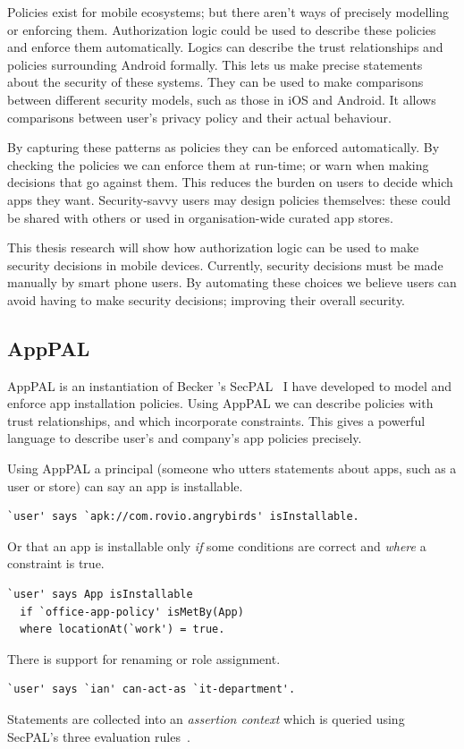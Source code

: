 \documentclass[a4paper]{scrartcl}
\begin{document}
Policies exist for mobile ecosystems; but there aren't ways of precisely modelling or enforcing them.
Authorization logic could be used to describe these policies and enforce them automatically.
Logics can describe the trust relationships and policies surrounding Android formally.
This lets us make precise statements about the security of these systems.
They can be used to make comparisons between different security models, such as those in iOS and Android.
It allows comparisons between user's privacy policy and their actual behaviour.

By capturing these patterns as policies they can be enforced automatically.
By checking the policies we can enforce them at run-time; or warn when making decisions that go against them.
This reduces the burden on users to decide which apps they want.
Security-savvy users may design policies themselves: these could be shared with others or used in organisation-wide curated app stores.

This thesis research will show how authorization logic can be used to make security decisions in mobile devices.
Currently, security decisions must be made manually by smart phone users.
By automating these choices we believe users can avoid having to make security decisions; improving their overall security.

\subsection{AppPAL}

AppPAL is an instantiation of Becker \etal's SecPAL~\citep{Becker:2006vh} I have developed to model and enforce app installation policies.
Using AppPAL we can describe policies with trust relationships, and which incorporate constraints.
This gives a powerful language to describe user's and company's app policies precisely.

Using AppPAL a principal (someone who utters statements about apps, such as a user or store) can say an app is installable.
\begin{lstlisting}
`user' says `apk://com.rovio.angrybirds' isInstallable.
\end{lstlisting}
Or that an app is installable only \emph{if} some conditions are correct and \emph{where} a constraint is true.
\begin{lstlisting}
`user' says App isInstallable
  if `office-app-policy' isMetBy(App)
  where locationAt(`work') = true.
\end{lstlisting}
There is support for renaming or role assignment.
\begin{lstlisting}
`user' says `ian' can-act-as `it-department'.
\end{lstlisting}
Statements are collected into an \emph{assertion context} which is queried using SecPAL's three evaluation rules~\citep{Becker:2006vh}.
\end{document}

